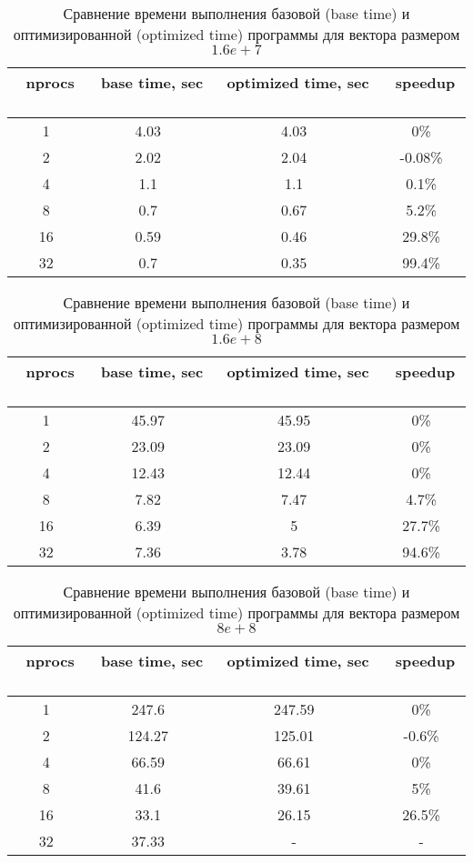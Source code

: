 \documentclass[12pt, oneside, a4paper]{article}
\begin{document}
\begin{table}[]
\caption{Сравнение времени выполнения базовой (base time) и оптимизированной (optimized time) программы для вектора размером $1.6e+7$}
\label{tab:results1}
\centering
\begin{tabular}{ | c | c | c | c |}
\hline
	\, nprocs \, & \, base time, sec \, & \, optimized time, sec \, & \, speedup \, \\
\hline
	1 & 4.03 & 4.03 & 0\% \\
	2 & 2.02 & 2.04 & -0.08\% \\
	4 & 1.1 & 1.1 & 0.1\% \\
	8 & 0.7 & 0.67 & 5.2\% \\
	16 & 0.59 & 0.46 & 29.8\% \\
	32 & 0.7 & 0.35 & 99.4\% \\
\hline
\end{tabular}
\end{table}

\begin{table}[]
\caption{Сравнение времени выполнения базовой (base time) и оптимизированной (optimized time) программы для вектора размером $1.6e+8$}
\label{tab:results2}
\centering
\begin{tabular}{ | c | c | c | c |}
\hline
	\, nprocs \, & \, base time, sec \, & \, optimized time, sec \, & \, speedup \, \\
\hline
	1 & 45.97 & 45.95 & 0\% \\
	2 & 23.09 & 23.09 & 0\% \\
	4 & 12.43 & 12.44 & 0\% \\
	8 & 7.82 & 7.47 & 4.7\% \\
	16 & 6.39 & 5 & 27.7\% \\
	32 & 7.36 & 3.78 & 94.6\% \\
\hline
\end{tabular}
\end{table}

\begin{table}[]
\caption{Сравнение времени выполнения базовой (base time) и оптимизированной (optimized time) программы для вектора размером $8e+8$}
\label{tab:results3}
\centering
\begin{tabular}{ | c | c | c | c |}
\hline
	\, nprocs \, & \, base time, sec \, & \, optimized time, sec \, & \, speedup \, \\
\hline
	1 & 247.6 & 247.59 & 0\% \\
	2 & 124.27 & 125.01 & -0.6\% \\
	4 & 66.59 & 66.61 & 0\% \\
	8 & 41.6 & 39.61 & 5\% \\
	16 & 33.1 & 26.15 & 26.5\% \\
	32 & 37.33 & - & - \\
\hline
\end{tabular}
\end{table}
\end{document}
